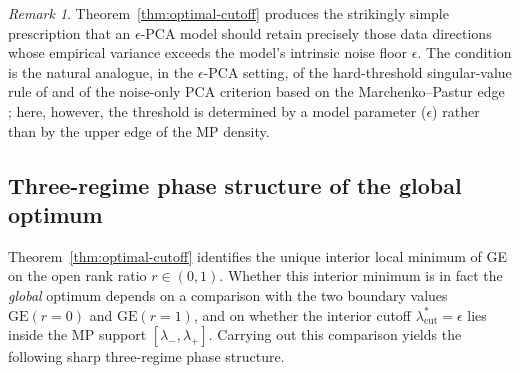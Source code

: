 \documentclass[11pt,a4paper]{article}
\theoremstyle{definition}
\theoremstyle{remark}
\newtheorem*{remark}{Remark}
\begin{document}
\begin{remark}
Theorem~\ref{thm:optimal-cutoff} produces the strikingly simple
prescription that an $\epsilon$-PCA model should retain precisely
those data directions whose empirical variance exceeds the model's
intrinsic noise floor $\epsilon$. The condition is the natural
analogue, in the $\epsilon$-PCA setting, of the hard-threshold
singular-value rule of \cite{GavishDonoho2014} and of the
noise-only PCA criterion based on the Marchenko--Pastur edge
\cite{Veraart2016MPPCA}; here, however, the threshold is determined
by a model parameter ($\epsilon$) rather than by the upper edge of
the MP density.
\end{remark}

\subsection{Three-regime phase structure of the global optimum}
\label{sec:phase}

Theorem~\ref{thm:optimal-cutoff} identifies the unique interior
local minimum of GE on the open rank ratio $r \in (0,1)$. Whether
this interior minimum is in fact the \emph{global} optimum
depends on a comparison with the two boundary values
$\mathrm{GE}(r{=}0)$ and $\mathrm{GE}(r{=}1)$, and on whether the
interior cutoff $\lambda_{\mathrm{cut}}^{*} = \epsilon$ lies
inside the MP support $[\lambda_{-}, \lambda_{+}]$. Carrying out
this comparison yields the following sharp three-regime phase
structure.
\end{document}
